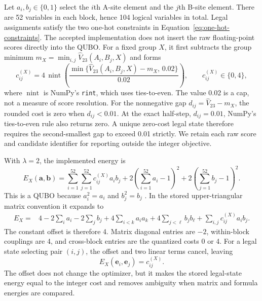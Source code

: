 Let $a_i,b_j\in\{0,1\}$ select the $i$th A-site element and the $j$th
B-site element.  There are 52 variables in each block, hence 104 logical
variables in total.  Legal assignments satisfy the two one-hot constraints
in Equation~\eqref{eq:one-hot-constraints}.  The accepted implementation does not insert the raw floating-point
scores directly into the QUBO.  For a fixed group $X$, it first subtracts
the group minimum
$m_X=\min_{i,j}\widehat V_{23}(A_i,B_j,X)$ and forms
\begin{equation}
 c_{ij}^{(X)} = 4\,\operatorname{nint}\!\left(
   \frac{\min\{\widehat V_{23}(A_i,B_j,X)-m_X,\,0.02\}}{0.02}
 \right),
 \qquad c_{ij}^{(X)}\in\{0,4\},
 \label{eq:q23-integer-cost}
\end{equation}
where $\operatorname{nint}$ is NumPy's \texttt{rint}, which uses ties-to-even.
The value 0.02 is a cap, not a measure of score resolution.  For the
nonnegative gap $d_{ij}=\widehat V_{23}-m_X$, the rounded cost is zero when
$d_{ij}<0.01$.  At the exact half-step, $d_{ij}=0.01$, NumPy's ties-to-even
rule also returns zero.  A unique zero-cost legal state therefore requires
the second-smallest gap to exceed 0.01 strictly.  We retain each raw score
and candidate identifier for reporting outside the integer objective.

With $\lambda=2$, the implemented energy is
\begin{equation}
 E_X(\boldsymbol a,\boldsymbol b)
 = \sum_{i=1}^{52}\sum_{j=1}^{52} c_{ij}^{(X)}a_i b_j
 +2\left(\sum_{i=1}^{52}a_i-1\right)^2
 +2\left(\sum_{j=1}^{52}b_j-1\right)^2.
 \label{eq:q23-accepted-qubo}
\end{equation}
This is a QUBO because $a_i^2=a_i$ and $b_j^2=b_j$
\cite{Glover2019QUBOTutorial,Lucas2014IsingNP}.  In the stored upper-triangular
matrix convention it expands to
\begin{align}
 E_X={}&4-2\sum_i a_i-2\sum_j b_j
 +4\sum_{i<k}a_i a_k+4\sum_{j<\ell}b_j b_\ell
 +\sum_{i,j}c_{ij}^{(X)}a_i b_j .
 \label{eq:q23-expanded-qubo}
\end{align}
The constant offset is therefore 4.  Matrix diagonal entries are $-2$,
within-block couplings are 4, and cross-block entries are the quantized
costs 0 or 4.  For a legal state selecting pair $(i,j)$, the offset and two
linear terms cancel, leaving
\begin{equation}
 E_X(\boldsymbol e_i,\boldsymbol e_j)=c_{ij}^{(X)}.
 \label{eq:q23-legal-energy}
\end{equation}
The offset does not change the optimizer, but it makes the stored legal-state
energy equal to the integer cost and removes ambiguity when matrix and
formula energies are compared.

